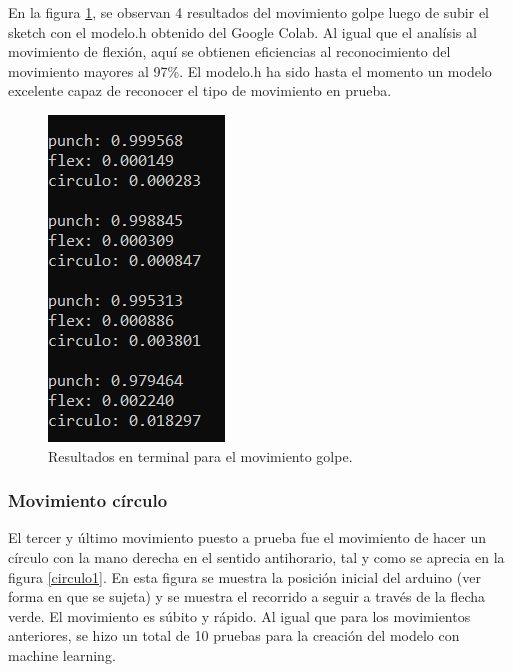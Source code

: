 En la figura \ref{golpe3}, se observan 4 resultados del movimiento golpe luego de subir el sketch con el modelo.h obtenido del Google Colab. Al igual que el analísis al movimiento de flexión, aquí se obtienen eficiencias al reconocimiento del movimiento mayores al 97\%. El modelo.h ha sido hasta el momento un modelo excelente capaz de reconocer el tipo de movimiento en prueba.

    \begin{figure}[H]
        \centering
        \includegraphics[width=0.3\linewidth]{pics/punch3.png}
        \caption{Resultados en terminal para el movimiento golpe.}
        \label{golpe3}
    \end{figure}

\subsubsection{Movimiento círculo}

El tercer y último movimiento puesto a prueba fue el movimiento de hacer un círculo con la mano derecha en el sentido antihorario, tal y como se aprecia en la figura \ref{circulo1}. En esta figura se muestra la posición inicial del arduino (ver forma en que se sujeta) y se muestra el recorrido a seguir a través de la flecha verde. El movimiento es súbito y rápido. Al igual que para los movimientos anteriores, se hizo un total de 10 pruebas para la creación del modelo con machine learning.

